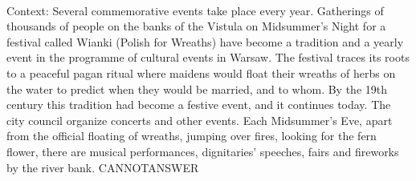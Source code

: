 \documentclass[11pt,a4paper, onecolumn]{article}
\begin{document}
\\ Context: Several commemorative events take place every year. Gatherings of thousands of people on the banks of the Vistula on Midsummer’s Night for a festival called Wianki (Polish for Wreaths) have become a tradition and a yearly event in the programme of cultural events in Warsaw. The festival traces its roots to a peaceful pagan ritual where maidens would float their wreaths of herbs on the water to predict when they would be married, and to whom. By the 19th century this tradition had become a festive event, and it continues today. The city council organize concerts and other events. Each Midsummer’s Eve, apart from the official floating of wreaths, jumping over fires, looking for the fern flower, there are musical performances, dignitaries' speeches, fairs and fireworks by the river bank. CANNOTANSWER
\end{document}
